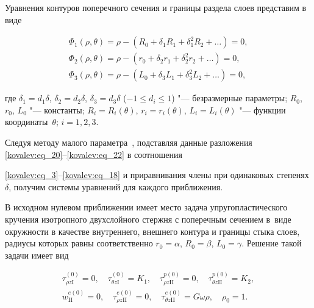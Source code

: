 Уравнения контуров поперечного сечения и границы раздела слоев представим в виде

\begin{equation}

\label{kovalev:eq_22}

  \begin{array}{l}

    \Phi_1(\rho,\theta)=\rho-(R_0+\delta_1R_1+\delta_1^2R_2+\ldots)=0, \\[2mm]

    \Phi_2(\rho,\theta)=\rho-(r_0+\delta_2r_1+\delta_2^2r_2+\ldots)=0, \\[2mm]

    \Phi_3(\rho,\theta)=\rho-(L_0+\delta_3L_1+\delta_3^2L_2+\ldots)=0,

  \end{array}

\end{equation}

где $\delta_1= d_1\delta$, $\delta_2= d_2\delta$, $\delta_3= d_3\delta$ ($-1\leqslant d_i\leqslant 1$) "--- безразмерные параметры;  $R_0$, $r_0$, $L_0$ "--- константы; $R_i=R_i(\theta)$, $r_i=r_i(\theta)$, $L_i=L_i(\theta)$ "--- функции координаты~$\theta$; $i=1, 2, 3$.



Следуя методу малого параметра~\cite{kovalev:bibl_2,kovalev:bibl_10}, подставляя данные разложения \eqref{kovalev:eq_20}--\eqref{kovalev:eq_22} в соотношения 

\eqref{kovalev:eq_3}--\eqref{kovalev:eq_18} и приравнивания члены при одинаковых степенях $\delta$, получим системы уравнений для каждого приближения.



В исходном нулевом приближении имеет место задача упругопластического кручения изотропного двухслойного стержня с поперечным сечением в~виде окружности в качестве внутреннего, внешнего контура и границы стыка слоев, радиусы которых равны соответственно $r_0=\alpha$, $R_0=\beta$, $L_0=\gamma$.  Решение такой задачи имеет вид

 \begin{gather}

\label{kovalev:eq_23}

    \tau_{\rho z\mathrm{I}}^{(0)}=0, \quad  \tau_{\theta z\mathrm{I}}^{(0)}=K_1, \quad 

    \tau_{\rho z\mathrm{II}}^{p(0)}=0, \quad  \tau_{\theta z\mathrm{II}}^{p(0)}=K_2,

\\

\label{kovalev:eq_24}

  w_{\mathrm{II}}^{e(0)}=0, \quad \tau_{\rho z\mathrm{II}}^{e(0)}=0, \quad

  \tau_{\theta z\mathrm{II}}^{e(0)}=G\omega\rho, \quad \rho_0=1.

 \end{gather}



